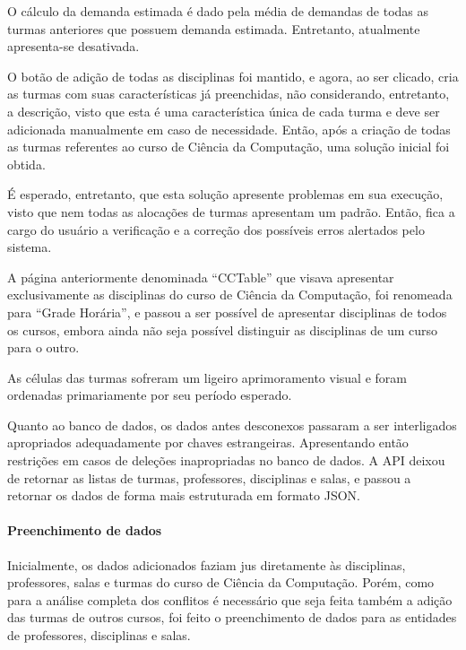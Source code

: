 O cálculo da demanda estimada é dado pela média de demandas de todas as turmas anteriores que possuem demanda estimada. Entretanto, atualmente apresenta-se desativada.


O botão de adição de todas as disciplinas foi mantido, e agora, ao ser clicado, cria as turmas com suas características já preenchidas, não considerando, entretanto, a descrição, visto que esta é uma característica única de cada turma e deve ser adicionada manualmente em caso de necessidade. Então, após a criação de todas as turmas referentes ao curso de Ciência da Computação, uma solução inicial foi obtida.

É esperado, entretanto, que esta solução apresente problemas em sua execução, visto que nem todas as alocações de turmas apresentam um padrão. Então, fica a cargo do usuário a verificação e a correção dos possíveis erros alertados pelo sistema.


A página anteriormente denominada ``CCTable'' que visava apresentar exclusivamente as disciplinas do curso de Ciência da Computação, foi renomeada para ``Grade Horária'', e passou a ser possível de apresentar disciplinas de todos os cursos, embora ainda não seja possível distinguir as disciplinas de um curso para o outro.

As células das turmas sofreram um ligeiro aprimoramento visual e foram ordenadas primariamente por seu período esperado.


Quanto ao banco de dados, os dados antes desconexos passaram a ser interligados apropriados adequadamente por chaves estrangeiras. Apresentando então restrições em casos de deleções inapropriadas no banco de dados. A API deixou de retornar as listas de turmas, professores, disciplinas e salas, e passou a retornar os dados de forma mais estruturada em formato JSON.

\paragraph*{Preenchimento de dados}

Inicialmente, os dados adicionados faziam jus diretamente às disciplinas, professores, salas e turmas do curso de Ciência da Computação. Porém, como para a análise completa dos conflitos é necessário que seja feita também a adição das turmas de outros cursos, foi feito o preenchimento de dados para as entidades de professores, disciplinas e salas.

